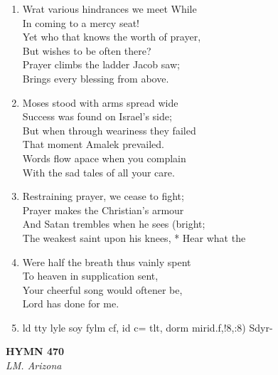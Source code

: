 \documentclass[11pt,a4paper]{article}
\begin{document}
\begin{enumerate}
    \item Wrat various hindrances we meet While \\
        In coming to a mercy seat! \\
        Yet who that knows the worth of prayer, \\
        But wishes to be often there? \\
        Prayer climbs the ladder Jacob saw; \\
        Brings every blessing from above.

    \item Moses stood with arms spread wide \\
        Success was found on Israel's side; \\
        But when through weariness they failed \\
        That moment Amalek prevailed. \\
        Words flow apace when you complain \\
        With the sad tales of all your care.

    \item Restraining prayer, we cease to fight; \\
        Prayer makes the Christian's armour \\
        And Satan trembles when he sees (bright; \\
        The weakest saint upon his knees, * Hear what the

    \item Were half the breath thus vainly spent \\
        To heaven in supplication sent, \\
        Your cheerful song would oftener be, \\
        Lord has done for me.

    \item ld tty lyle soy fylm cf, id c= tlt, dorm mirid.f,!8,:8) Sdyr-

\end{enumerate}

\newpage
\begin{center}
    {\Large \textbf{HYMN 470}}
    \\
    \textit{LM. Arizona}
\end{center}
\vspace{1em}
\end{document}
